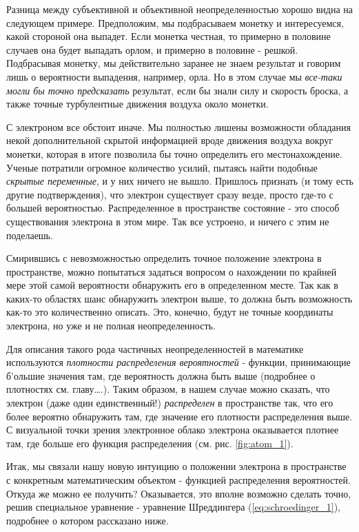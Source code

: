 Разница между субъективной и объективной неопределенностью хорошо видна на следующем примере.
Предположим, мы подбрасываем монетку и интересуемся, какой стороной она выпадет.
Если монетка честная, то примерно в половине случаев она будет выпадать орлом, и примерно в половине - решкой.
Подбрасывая монетку, мы действительно заранее не знаем результат и говорим лишь о вероятности выпадения, например, орла.
Но в этом случае мы \textit{все-таки могли бы точно предсказать} результат, если бы знали силу и скорость броска, а также точные турбулентные движения воздуха около монетки.

С электроном все обстоит иначе.
Мы полностью лишены возможности обладания некой дополнительной скрытой информацией вроде движения воздуха вокруг монетки, которая в итоге позволила бы точно определить его местонахождение.
Ученые потратили огромное количество усилий, пытаясь найти подобные \textit{скрытые переменные}, и у них ничего не вышло.
Пришлось признать (и тому есть другие подтверждения), что электрон существует сразу везде, просто где-то с большей вероятностью. 
Распределенное в пространстве состояние - это способ существования электрона в этом мире.
Так все устроено, и ничего с этим не поделаешь. 

Смирившись с невозможностью определить точное положение электрона в пространстве, можно попытаться задаться вопросом о нахождении по крайней мере этой самой вероятности обнаружить его в определенном месте.
Так как в каких-то областях шанс обнаружить электрон выше, то должна быть возможность как-то это количественно описать.
Это, конечно, будут не точные координаты электрона, но уже и не полная неопределенность.

Для описания такого рода частичных неопределенностей в математике используются \textit{плотности распределения вероятностей} - функции, принимающие б'ольшие значения там, где вероятность должна быть выше (подробнее о плотностях см. главу….).
Таким образом, в нашем случае можно сказать, что электрон (даже один единственный!) \textit{распределен} в пространстве так, что его более вероятно обнаружить там, где значение его плотности распределения выше.
С визуальной точки зрения электронное облако электрона оказывается плотнее там, где больше его функция распределения (см. рис. \ref{fig:atom_1}).

Итак, мы связали нашу новую интуицию о положении электрона в пространстве с конкретным математическим объектом - функцией распределения вероятностей. 
Откуда же можно ее получить?
Оказывается, это вполне возможно сделать точно, решив специальное уравнение - уравнение Шреддингера  (\ref{eq:schroedinger_1}), подробнее о котором рассказано ниже.


